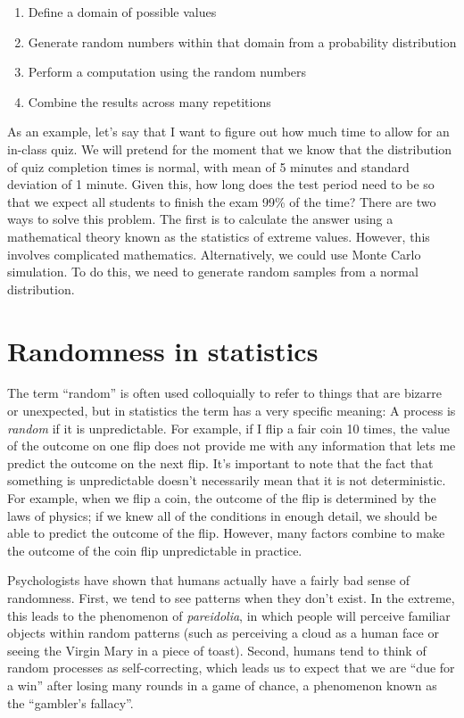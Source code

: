 \documentclass[
  12pt,
]{book}
\providecommand{\tightlist}{%
  \setlength{\itemsep}{0pt}\setlength{\parskip}{0pt}}
\begin{document}
\begin{enumerate}
\def\labelenumi{\arabic{enumi}.}
\tightlist
\item
  Define a domain of possible values
\item
  Generate random numbers within that domain from a probability distribution
\item
  Perform a computation using the random numbers
\item
  Combine the results across many repetitions
\end{enumerate}

As an example, let's say that I want to figure out how much time to allow for an in-class quiz. We will pretend for the moment that we know that the distribution of quiz completion times is normal, with mean of 5 minutes and standard deviation of 1 minute. Given this, how long does the test period need to be so that we expect all students to finish the exam 99\% of the time? There are two ways to solve this problem. The first is to calculate the answer using a mathematical theory known as the statistics of extreme values. However, this involves complicated mathematics. Alternatively, we could use Monte Carlo simulation. To do this, we need to generate random samples from a normal distribution.

\hypertarget{randomness-in-statistics}{%
\section{Randomness in statistics}\label{randomness-in-statistics}}

The term ``random'' is often used colloquially to refer to things that are bizarre or unexpected, but in statistics the term has a very specific meaning: A process is \emph{random} if it is unpredictable. For example, if I flip a fair coin 10 times, the value of the outcome on one flip does not provide me with any information that lets me predict the outcome on the next flip. It's important to note that the fact that something is unpredictable doesn't necessarily mean that it is not deterministic. For example, when we flip a coin, the outcome of the flip is determined by the laws of physics; if we knew all of the conditions in enough detail, we should be able to predict the outcome of the flip. However, many factors combine to make the outcome of the coin flip unpredictable in practice.

Psychologists have shown that humans actually have a fairly bad sense of randomness. First, we tend to see patterns when they don't exist. In the extreme, this leads to the phenomenon of \emph{pareidolia}, in which people will perceive familiar objects within random patterns (such as perceiving a cloud as a human face or seeing the Virgin Mary in a piece of toast). Second, humans tend to think of random processes as self-correcting, which leads us to expect that we are ``due for a win'' after losing many rounds in a game of chance, a phenomenon known as the ``gambler's fallacy''.
\end{document}
